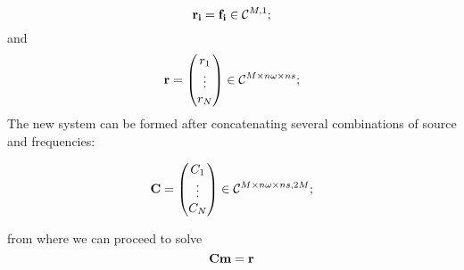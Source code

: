 \documentclass[10pt]{article}
\begin{document}
\[
 {\bf r_i} = {\bf f_i} \in \mathcal{C}^{M,1};
\]and
\[
{\bf r} = 
 \begin{pmatrix}
  r_1     \\
  \vdots  \\
  r_N    
 \end{pmatrix} \in \mathcal{C}^{M\times n\omega \times ns};
\]
The new system can be formed after concatenating several combinations of source and frequencies:

\[
{\bf C } = 
 \begin{pmatrix}
  C_1     \\
  \vdots  \\
  C_N    
 \end{pmatrix} \in \mathcal{C}^{M\times n\omega \times ns, 2M};
\]

from where we can proceed to solve
\begin{equation}
{\bf C} {\bf m} = \bf r
\end{equation}
\end{document}
